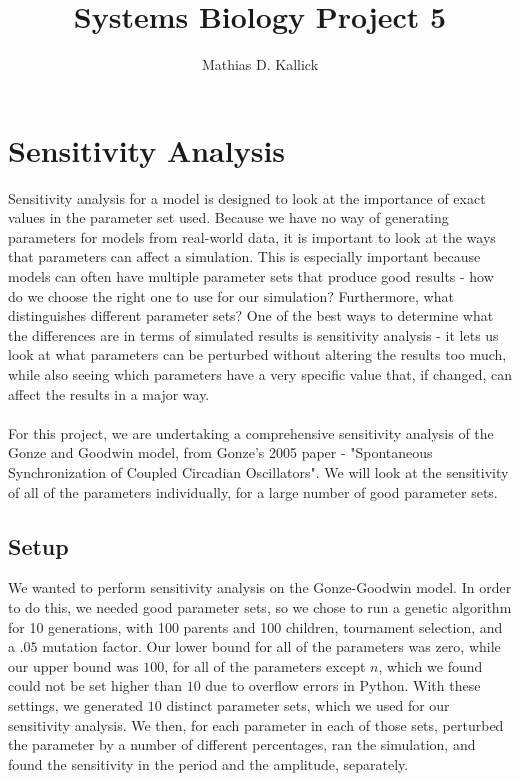 \documentclass[]{article}
\title{Systems Biology Project 5}
\author{Mathias D. Kallick}
\begin{document}
	
	\maketitle
	
	\section{Sensitivity Analysis}
	Sensitivity analysis for a model is designed to look at the importance of exact values in the parameter set used. Because we have no way of generating parameters for models from real-world data, it is important to look at the ways that parameters can affect a simulation. This is especially important because models can often have multiple parameter sets that produce good results - how do we choose the right one to use for our simulation? Furthermore, what distinguishes different parameter sets? One of the best ways to determine what the differences are in terms of simulated results is sensitivity analysis - it lets us look at what parameters can be perturbed without altering the results too much, while also seeing which parameters have a very specific value that, if changed, can affect the results in a major way. \\ \\
	For this project, we are undertaking a comprehensive sensitivity analysis of the Gonze and Goodwin model, from Gonze's 2005 paper - "Spontaneous Synchronization of Coupled Circadian Oscillators". We will look at the sensitivity of all of the parameters individually, for a large number of good parameter sets.
	
	\subsection{Setup}
	We wanted to perform sensitivity analysis on the Gonze-Goodwin model. In order to do this, we needed good parameter sets, so we chose to run a genetic algorithm for 10 generations, with 100 parents and 100 children, tournament selection, and a $.05$ mutation factor. Our lower bound for all of the parameters was zero, while our upper bound was $100$, for all of the parameters except $n$, which we found could not be set higher than $10$ due to overflow errors in Python. With these settings, we generated $10$ distinct parameter sets, which we used for our sensitivity analysis. We then, for each parameter in each of those sets, perturbed the parameter by a number of different percentages, ran the simulation, and found the sensitivity in the period and the amplitude, separately.
	
\end{document}
